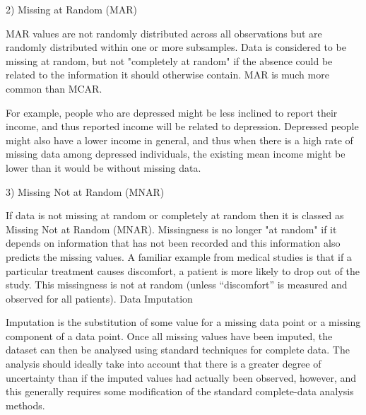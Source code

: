 2) Missing at Random (MAR)

MAR values are not randomly distributed across all observations but are randomly distributed within one or more subsamples. Data is considered to be missing at random, but not "completely at random" if the absence could be related to the information it should otherwise contain. MAR is much more common than MCAR.

For example, people who are depressed might be less inclined to report their income, and thus reported income will be related to depression. Depressed people might also have a lower income in general, and thus when there is a high rate of missing data among depressed individuals, the existing mean income might be lower than it would be without missing data. 

3) Missing Not at Random (MNAR)

If data is not missing at random or completely at random then it is classed as Missing Not at Random (MNAR). Missingness is no longer "at random" if it depends on information that has not been recorded and this information also predicts the missing values. 
A familiar example from medical studies is that if a particular treatment causes discomfort, a patient is more likely to drop out of the study. This missingness is not at random (unless “discomfort” is measured and observed for all patients).
Data Imputation

Imputation is the substitution of some value for a missing data point or a missing component of a data point. Once all missing values have been imputed, the dataset can then be analysed using standard techniques for complete data. The analysis should ideally take into account that there is a greater degree of uncertainty than if the imputed values had actually been observed, however, and this generally requires some modification of the standard complete-data analysis methods. 


